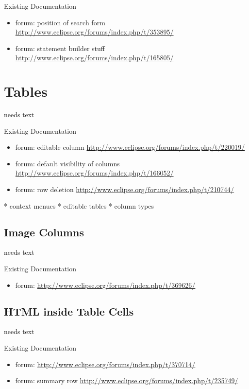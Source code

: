 \documentclass[a4paper,10pt,twoside]{book}
\begin{document}
{\noindent Existing Documentation
\begin{itemize}
  \item forum: position of search form \url{http://www.eclipse.org/forums/index.php/t/353895/}
  \item forum: statement builder stuff \url{http://www.eclipse.org/forums/index.php/t/165805/}
\end{itemize}

\section{Tables}
needs text

\noindent Existing Documentation
\begin{itemize}
  \item forum: editable column \url{http://www.eclipse.org/forums/index.php/t/220019/}
  \item forum: default visibility of columns \url{http://www.eclipse.org/forums/index.php/t/166052/}
  \item forum: row deletion \url{http://www.eclipse.org/forums/index.php/t/210744/}
\end{itemize}

	* context menues
	* editable tables
    * column types

\subsection{Image Columns}
needs text

\noindent Existing Documentation
\begin{itemize}
  \item forum: \url{http://www.eclipse.org/forums/index.php/t/369626/}
\end{itemize}

\subsection{HTML inside Table Cells}
needs text

\noindent Existing Documentation
\begin{itemize}
  \item forum: \url{http://www.eclipse.org/forums/index.php/t/370714/}
  \item forum: summary row \url{http://www.eclipse.org/forums/index.php/t/235749/}
\end{itemize}

}
\end{document}
